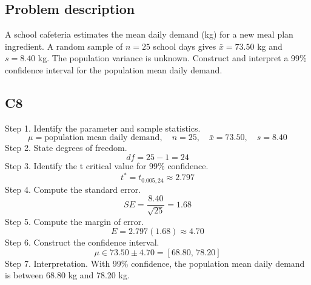 \begin{ExamProblems}
		\newpage
		\item
		\subsection*{Problem description}
		A school cafeteria estimates the mean daily demand (kg) for a new meal plan ingredient.
		A random sample of $n=25$ school days gives $\bar{x}=73.50$ kg and $s=8.40$ kg.
		The population variance is unknown.
		Construct and interpret a 99\% confidence interval for the population mean daily demand.
		
		\subsection*{C8}
		Step 1.
		Identify the parameter and sample statistics.
		\[
		\mu=\text{population mean daily demand},\quad n=25,\quad \bar{x}=73.50,\quad s=8.40
		\]
		Step 2.
		State degrees of freedom.
		\[
		df=25-1=24
		\]
		Step 3.
		Identify the t critical value for 99\% confidence.
		\[
		t^*=t_{0.005,24}\approx 2.797
		\]
		Step 4.
		Compute the standard error.
		\[
		SE=\frac{8.40}{\sqrt{25}}=1.68
		\]
		Step 5.
		Compute the margin of error.
		\[
		E=2.797(1.68)\approx 4.70
		\]
		Step 6.
		Construct the confidence interval.
		\[
		\mu\in 73.50\pm 4.70=[68.80,\,78.20]
		\]
		Step 7.
		Interpretation.
		With 99\% confidence, the population mean daily demand is between 68.80 kg and 78.20 kg.
	\end{ExamProblems}

